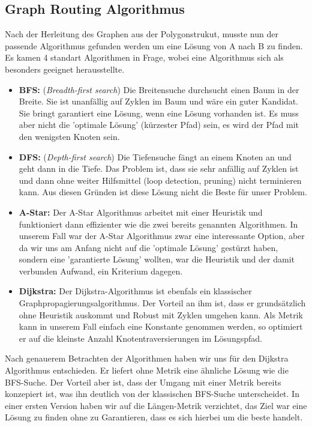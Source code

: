 \subsection{Graph Routing Algorithmus}
Nach der Herleitung des Graphen aus der Polygonstrukut, musste nun der passende Algorithmus gefunden werden um eine Lösung von A nach B zu finden. Es kamen 4 standart Algorithmen in Frage, wobei eine Algorithmus sich als besonders geeignet herausstellte.
\begin{itemize}
	\item{\textbf{BFS:} (\textit{Breadth-first search}) Die Breitensuche durchsucht einen Baum in der Breite. Sie ist unanfällig auf Zyklen im Baum und wäre ein guter Kandidat. Sie bringt garantiert eine Lösung, wenn eine Lösung vorhanden ist. Es muss aber nicht die 'optimale Lösung' (kürzester Pfad) sein, es wird der Pfad mit den wenigsten Knoten sein. \cite{AiClass}}
	\item{\textbf{DFS:} (\textit{Depth-first search}) Die Tiefensuche fängt an einem Knoten an und geht dann in die Tiefe. Das Problem ist, dass sie sehr anfällig auf Zyklen ist und dann ohne weiter Hilfsmittel (loop detection, pruning) nicht terminieren kann. Aus diesen Gründen ist diese Lösung nicht die Beste für unser Problem. \cite{AiClass}}
	\item{\textbf{A-Star:} Der A-Star Algorithmus arbeitet mit einer Heuristik und funktioniert dann effizienter wie die zwei bereits genannten Algorithmen. In unserem Fall war der A-Star Algorithmus zwar eine interessante Option, aber da wir uns am Anfang nicht auf die 'optimale Lösung' gestürzt haben, sondern eine 'garantierte Lösung' wollten, war die Heuristik und der damit verbunden Aufwand, ein Kriterium dagegen. \cite{AiClass}}
	\item{\textbf{Dijkstra:} Der Dijkstra-Algorithmus ist ebenfals ein klassischer Graphpropagierungsalgorithmus. Der Vorteil an ihm ist, dass er grundsätzlich ohne Heuristik auskommt und Robust mit Zyklen umgehen kann. Als Metrik kann in unserem Fall einfach eine Konstante genommen werden, so optimiert er auf die kleinste Anzahl Knotentraversierungen im Lösungspfad.}
\end{itemize}
Nach genauerem Betrachten der Algorithmen haben wir uns für den Dijkstra Algorithmus entschieden. Er liefert ohne Metrik eine ähnliche Lösung wie die BFS-Suche. Der Vorteil aber ist, dass der Umgang mit einer Metrik bereits konzepiert ist, was ihn deutlich von der klassischen BFS-Suche unterscheidet.
In einer ersten Version haben wir auf die Längen-Metrik verzichtet, das Ziel war eine Lösung zu finden ohne zu Garantieren, dass es sich hierbei um die beste handelt.


